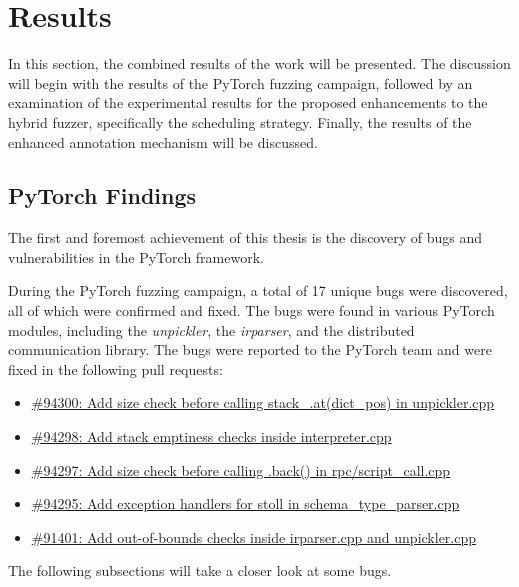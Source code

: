 \section{Results}

In this section, the combined results of the work will be presented. The discussion will begin with the results of the PyTorch fuzzing campaign, followed by an examination of the experimental results for the proposed enhancements to the hybrid fuzzer, specifically the scheduling strategy. Finally, the results of the enhanced annotation mechanism will be discussed.

\subsection{PyTorch Findings} \label{results:pytorch-findings}

The first and foremost achievement of this thesis is the discovery of bugs and vulnerabilities in the PyTorch framework.

During the PyTorch fuzzing campaign, a total of 17 unique bugs were discovered, all of which were confirmed and fixed. The bugs were found in various PyTorch modules, including the \textit{unpickler}, the \textit{irparser}, and the distributed communication library. The bugs were reported to the PyTorch team and were fixed in the following pull requests:

\begin{itemize}
    \item \href{https://github.com/pytorch/pytorch/pull/94300}{\#94300: Add size check before calling stack\_.at(dict\_pos) in unpickler.cpp}
    \item \href{https://github.com/pytorch/pytorch/pull/94298}{\#94298: Add stack emptiness checks inside interpreter.cpp}
    \item \href{https://github.com/pytorch/pytorch/pull/94297}{\#94297: Add size check before calling .back() in rpc/script\_call.cpp}
    \item \href{https://github.com/pytorch/pytorch/pull/94295}{\#94295: Add exception handlers for stoll in schema\_type\_parser.cpp}
    \item \href{https://github.com/pytorch/pytorch/pull/91401}{\#91401: Add out-of-bounds checks inside irparser.cpp and unpickler.cpp}
\end{itemize}

The following subsections will take a closer look at some bugs.


